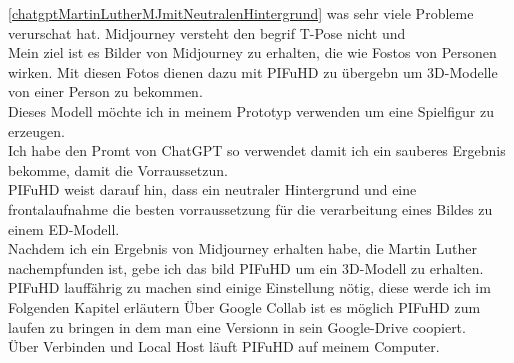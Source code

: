 \documentclass[10pt,a4paper,bibliography=totocnumbered,listof=totocnumbered]{scrartcl}
\begin{document}
\ref{chatgptMartinLutherMJmitNeutralenHintergrund} was sehr viele Probleme verurschat hat. Midjourney versteht den begrif T-Pose nicht und 
\\
Mein ziel ist es Bilder von Midjourney zu erhalten, die wie Fostos von Personen wirken. Mit diesen Fotos dienen dazu mit PIFuHD zu übergebn um 3D-Modelle von einer Person zu bekommen.
\\
Dieses Modell möchte ich in meinem Prototyp verwenden um eine Spielfigur zu erzeugen.
\\
Ich habe den Promt von ChatGPT so verwendet damit ich ein sauberes Ergebnis bekomme, damit die Vorraussetzun.
\\
PIFuHD weist darauf hin, dass ein neutraler Hintergrund und eine frontalaufnahme die besten vorraussetzung für die verarbeitung eines Bildes zu einem ED-Modell.
\\
Nachdem ich ein Ergebnis von Midjourney erhalten habe, die Martin Luther nachempfunden ist, gebe ich das bild PIFuHD um ein 3D-Modell zu erhalten.
\\
PIFuHD lauffährig zu machen sind einige Einstellung nötig, diese werde ich im Folgenden Kapitel erläutern
Über Google Collab ist es möglich PIFuHD zum laufen zu bringen in dem man eine Versionn in sein Google-Drive coopiert.
\\
Über Verbinden und Local Host läuft PIFuHD auf meinem Computer.
\end{document}
